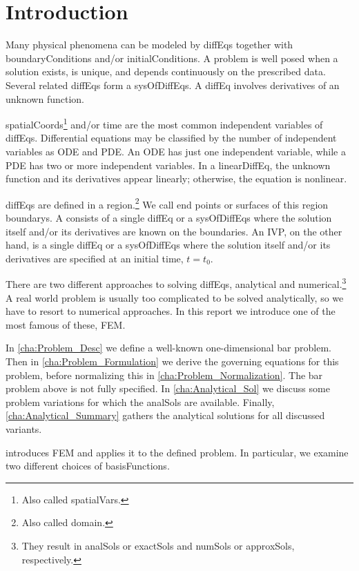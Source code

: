 \section{Introduction}
Many physical phenomena can be modeled by \glspl{diffEq} together with \glspl{boundaryCondition} and/or
\glspl{initialCondition}. A problem is well posed when a solution exists, is unique, and depends continuously on the prescribed
data. Several related \glspl{diffEq} form a \gls{sysOfDiffEqs}. A \gls{diffEq} involves derivatives of an unknown function.

\Glspl{spatialCoord}\footnote{Also called \glspl{spatialVar}.} and/or time are the most common independent
variables of \glspl{diffEq}. Differential equations may be classified by the number of independent variables as
\gls{ODE} and \gls{PDE}. An \gls{ODE} has just one independent variable, while a \gls{PDE} has two or more independent variables.
In a \gls{linearDiffEq}, the unknown function and its derivatives appear linearly; otherwise, the equation is nonlinear.

\Glspl{diffEq} are defined in a \gls{region}.\footnote{Also called \gls{domain}.} We call end points or surfaces of this region
\glspl{boundary}. A  consists of a single \gls{diffEq} or a \gls{sysOfDiffEqs} where the solution itself and/or its
derivatives are known on the boundaries. An \gls{IVP}, on the other hand, is a single \gls{diffEq} or a \gls{sysOfDiffEqs}
where the solution itself and/or its derivatives are specified at an initial time, $t = t_0$.

There are two different approaches to solving \glspl{diffEq}, analytical and numerical.\footnote{They result in \glspl{analSol}
or \glspl{exactSol} and \glspl{numSol} or \glspl{approxSol}, respectively.} A real world problem is usually too complicated to be
solved analytically, so we have to resort to numerical approaches. In this report we introduce one of the most famous of these,
\gls{FEM}.

In \cref{cha:Problem_Desc} we define a well-known one-dimensional bar problem. Then in \cref{cha:Problem_Formulation} we derive
the governing equations for this problem, before normalizing this in \cref{cha:Problem_Normalization}. The bar problem above is
not fully specified. In \cref{cha:Analytical_Sol} we discuss some problem variations for which the \glspl{analSol} are available.
Finally, \cref{cha:Analytical_Summary} gathers the analytical solutions for all discussed variants.
 
 introduces \gls{FEM} and applies it to the defined problem. In particular, we examine two different choices
of \glspl{basisFunction}.

